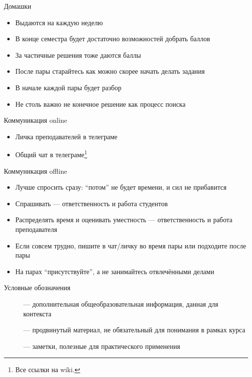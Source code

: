     \begin{frame}{Домашки}
        \begin{itemize}
            \item Выдаются на каждую неделю
            \item В конце семестра будет достаточно возможностей добрать баллов
            \item За частичные решения тоже даются баллы
            \item После пары старайтесь как можно скорее начать делать задания
            \item В начале каждой пары будет разбор
            \item[\NB] Не столь важно не конечное решение как процесс поиска
        \end{itemize}
    \end{frame}

    \begin{frame}[fragile]{Коммуникация online}
        \begin{itemize}
            \item Личка преподавателей в телеграме
            \item Общий чат в телеграме\footnote{Все ссылки на wiki.}
        \end{itemize}
    \end{frame}

    \begin{frame}[fragile]{Коммуникация offline}
        \begin{itemize}
            \item Лучше спросить сразу: ``потом'' не будет времени, и сил не прибавится
            \item Спрашивать --- ответственность и работа студентов
            \item Распределять время и оценивать уместность --- ответственность и работа преподавателя
            \item Если совсем трудно, пишите в чат/личку во время пары или подходите после пары
            \item На парах ``присутствуйте'', а не занимайтесь отвлечёнными делами
        \end{itemize}
    \end{frame}

    \begin{frame}[fragile]{Условные обозначения}
        \begin{description}
            \item [\popslide] --- дополнительная общеобразовательная информация, данная для контекста
            \item [\advancedslide] --- продвинутый материал, не обязательный для понимания в рамках курса
            \item[\practicalslide] --- заметки, полезные для практического применения
        \end{description}
    \end{frame}

